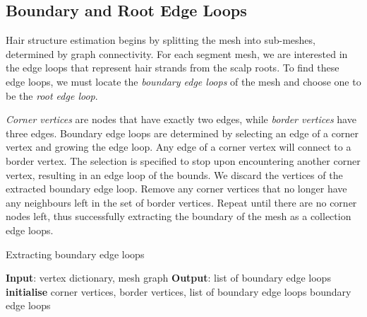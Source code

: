 \documentclass[ %
author={Dillon Keith Diep},
supervisor={Dr. Carl Henrik Ek},
degree={MEng},
title={ART-CG Hair:},
subtitle={Assisted Real-time Content Generation of Stylised Virtual Hair},
type={Research},
year={2017} ]{dissertation}
\begin{document}
\subsection{Boundary and Root Edge Loops}
Hair structure estimation begins by splitting the mesh into sub-meshes, determined by graph connectivity. For each segment mesh, we are interested in the edge loops that represent hair strands from the scalp roots. To find these edge loops, we must locate the \textit{boundary edge loops} of the mesh and choose one to be the \textit{root edge loop}.

\textit{Corner vertices} are nodes that have exactly two edges, while \textit{border vertices} have three edges. Boundary edge loops are determined by selecting an edge of a corner vertex and growing the edge loop. Any edge of a corner vertex will connect to a border vertex. The selection is specified to stop upon encountering another corner vertex, resulting in an edge loop of the bounds. We discard the vertices of the extracted boundary edge loop. Remove any corner vertices that no longer have any neighbours left in the set of border vertices. Repeat until there are no corner nodes left, thus successfully extracting the boundary of the mesh as a collection edge loops.

\begin{algorithm}[!h]
	\caption{Extracting boundary edge loops}
	\algrule
	\textbf{Input}: vertex dictionary, mesh graph\;
	\textbf{Output}: list of boundary edge loops\;
	\algrule
	\textbf{initialise} corner vertices, border vertices, list of boundary edge loops\;
	\Return boundary edge loops
\end{algorithm}
\end{document}
